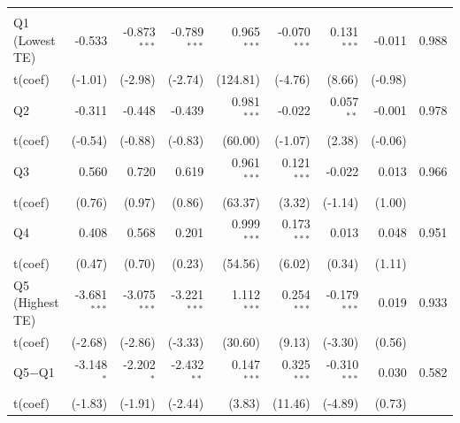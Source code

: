 \begin{table}[!htbp]
{\begin{tabular*}{\linewidth}{@{\extracolsep{\fill}}lrrrrrrrr}
\addlinespace[0.3em]
\hline
\multicolumn{9}{l}{Panel D: Active --- VW Net}\\
\hspace{1em}Q1 (Lowest TE) & -0.533 & -0.873$^{***}$ & -0.789$^{***}$ & 0.965$^{***}$ & -0.070$^{***}$ & 0.131$^{***}$ & -0.011 & 0.988\\
\hspace{1em}t(coef) & (-1.01) & (-2.98) & (-2.74) & (124.81) & (-4.76) & (8.66) & (-0.98) & \\
\hspace{1em}Q2 & -0.311 & -0.448 & -0.439 & 0.981$^{***}$ & -0.022 & 0.057$^{**}$ & -0.001 & 0.978\\
\hspace{1em}t(coef) & (-0.54) & (-0.88) & (-0.83) & (60.00) & (-1.07) & (2.38) & (-0.06) & \\
\hspace{1em}Q3 & 0.560 & 0.720 & 0.619 & 0.961$^{***}$ & 0.121$^{***}$ & -0.022 & 0.013 & 0.966\\
\hspace{1em}t(coef) & (0.76) & (0.97) & (0.86) & (63.37) & (3.32) & (-1.14) & (1.00) & \\
\hspace{1em}Q4 & 0.408 & 0.568 & 0.201 & 0.999$^{***}$ & 0.173$^{***}$ & 0.013 & 0.048 & 0.951\\
\hspace{1em}t(coef) & (0.47) & (0.70) & (0.23) & (54.56) & (6.02) & (0.34) & (1.11) & \\
\hspace{1em}Q5 (Highest TE) & -3.681$^{***}$ & -3.075$^{***}$ & -3.221$^{***}$ & 1.112$^{***}$ & 0.254$^{***}$ & -0.179$^{***}$ & 0.019 & 0.933\\
\hspace{1em}t(coef) & (-2.68) & (-2.86) & (-3.33) & (30.60) & (9.13) & (-3.30) & (0.56) & \\
\hspace{1em}Q5$-$Q1 & -3.148$^{*}$ & -2.202$^{*}$ & -2.432$^{**}$ & 0.147$^{***}$ & 0.325$^{***}$ & -0.310$^{***}$ & 0.030 & 0.582\\
\hspace{1em}t(coef) & (-1.83) & (-1.91) & (-2.44) & (3.83) & (11.46) & (-4.89) & (0.73) & \\
\bottomrule
\end{tabular*}%
}\sbefit
\fi
\setlength{\tabletempwidth}{\wd\tabletempbox}
\ifdim\tabletempwidth>\linewidth\setlength{\tabletempwidth}{\linewidth}\fi
\begin{minipage}{\tabletempwidth}

\end{minipage}
\end{table}
